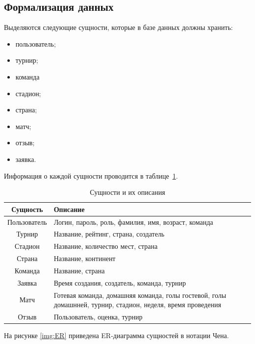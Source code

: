 \subsection{Формализация данных}

Выделяются следующие сущности, которые в базе данных должны хранить:
\begin{itemize}[left=36pt]
	\item пользователь;
	\item турнир;
	\item команда
	\item стадион;
	\item страна;
	\item матч;
	\item отзыв;
	\item заявка.
\end{itemize}

Информация о каждой сущности проводится в таблице~\ref{tb:data}.

\begin{table}[ht]
	\begin{center}
		\begin{threeparttable}
			\caption{\label{tb:data} Сущности и их описания}
			\begin{tabular}{|c|p{10cm}|}
				\hline
				\textbf{Сущность} & \textbf{Описание} \\ \hline
				Пользователь & Логин, пароль, роль, фамилия, имя, возраст, команда \\ \hline
				Турнир & Название, рейтинг, страна, создатель \\ \hline
				Стадион & Название, количество мест, страна \\ \hline
				Страна & Название, континент \\ \hline
				Команда & Название, страна \\ \hline
				Заявка & Время создания, создатель, команда, турнир \\ \hline
				Матч & Готевая команда, домашняя команда, голы гостевой, голы домашнней, турнир, стадион, неделя, время проведения \\ \hline
				Отзыв & Пользователь, оценка, турнир \\ \hline
			\end{tabular}
		\end{threeparttable}
	\end{center}
\end{table}

\newpage

На рисунке \ref{img:ER} приведена ER-диаграмма сущностей в нотации Чена.

